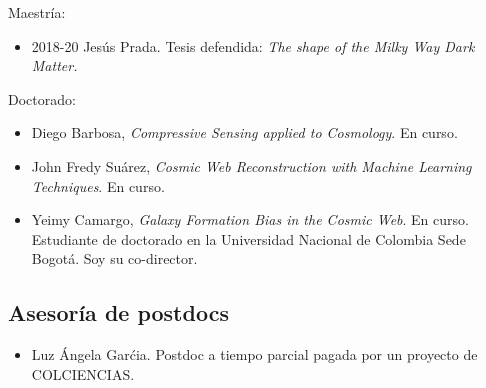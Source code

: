 \documentclass{article}
\begin{document}
Maestr\'ia:
\begin{itemize}
\item{2018-20} Jes\'us Prada. Tesis defendida: \emph{The shape of the Milky Way Dark Matter.}
\end{itemize}

Doctorado:
\begin{itemize}
\item Diego Barbosa, \emph{Compressive Sensing applied to
  Cosmology}. En curso.
\item John Fredy Su\'arez, \emph{Cosmic Web Reconstruction with
  Machine Learning Techniques}. En curso.
\item Yeimy Camargo, \emph{Galaxy Formation Bias in the Cosmic
  Web}. En curso. Estudiante de doctorado en la Universidad Nacional de Colombia
  Sede Bogot\'a. Soy su co-director.
\end{itemize}

\subsection{Asesor\'ia de postdocs}

\begin{itemize}
\item Luz \'Angela Gar\'cia. Postdoc a tiempo parcial
  pagada por un proyecto de COLCIENCIAS.
\end{itemize}
\end{document}
